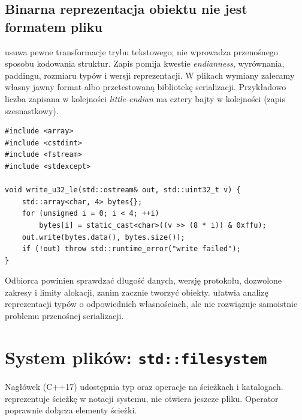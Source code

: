 \subsection{Binarna reprezentacja obiektu nie jest formatem pliku}

 usuwa pewne transformacje trybu tekstowego;
nie wprowadza przenośnego sposobu kodowania struktur. Zapis
 pomija kwestie
\emph{endianness}, wyrównania, paddingu, rozmiaru typów i wersji
reprezentacji. W plikach wymiany zalecamy własny jawny format albo
przetestowaną bibliotekę serializacji. Przykładowo liczba
 zapisana w kolejności \emph{little-endian} ma
cztery bajty w kolejności  (zapis szesnastkowy).

\begin{lstlisting}[caption={Jawny zapis liczby 32-bitowej w kolejnosci little-endian (C++20).}]
#include <array>
#include <cstdint>
#include <fstream>
#include <stdexcept>

void write_u32_le(std::ostream& out, std::uint32_t v) {
    std::array<char, 4> bytes{};
    for (unsigned i = 0; i < 4; ++i)
        bytes[i] = static_cast<char>((v >> (8 * i)) & 0xffu);
    out.write(bytes.data(), bytes.size());
    if (!out) throw std::runtime_error("write failed");
}
\end{lstlisting}

Odbiorca powinien sprawdzać długość danych, wersję protokołu,
dozwolone zakresy i limity alokacji, zanim zacznie tworzyć obiekty.
 ułatwia analizę reprezentacji typów o odpowiednich
własnościach, ale nie rozwiązuje samoistnie problemu przenośnej serializacji.

\section{System plików: \texttt{std::filesystem}}
\label{sec:cpp19-filesystem}

Nagłówek  (C++17) udostępnia typ 
oraz operacje na ścieżkach i katalogach.  reprezentuje
ścieżkę w notacji systemu, nie otwiera jeszcze pliku. Operator
\code{/} poprawnie dołącza elementy ścieżki.

